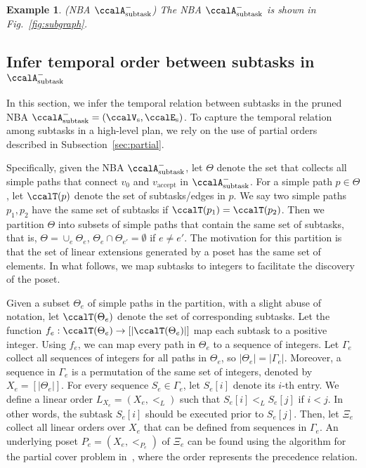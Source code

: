 \documentclass[journal]{IEEEtran}
\newtheorem{exmp}{Example}
\newcommand{\auto}[1]{\ccalA_{\text{#1}}}
\newenvironment{cexmp}
{\addtocounter{exmp}{-1}\begin{exmp}}
  {\end{exmp}}
\begin{document}
\begin{cexmp}(NBA $\auto{subtask}^-$)
 The NBA $\auto{subtask}^-$ is shown in Fig.~\ref{fig:subgraph}.
\end{cexmp}

\subsection{Infer temporal order between subtasks in  $\auto{subtask}^-$}\label{sec:poset}
In this section,  we infer the temporal relation between subtasks in the pruned NBA $\auto{subtask}^- = (\ccalV_\text{s}, \ccalE_\text{s})$. To capture the temporal relation among subtasks in a high-level plan,  we rely on the use of partial orders described in Subsection~\ref{sec:partial}.


Specifically, given the NBA $\auto{subtask}^-$, let $\Theta$ denote the set that collects all simple paths that connect $v_0$ and $v_{\text{accept}}$ in $\auto{subtask}^-$. For a simple path $p\in\Theta$, let $\ccalT(p)$ denote the set of subtasks/edges in $p$. We say two simple paths $p_1, p_2$ have the same set of subtasks if $\ccalT(p_1) =\ccalT(p_2)$. Then we partition $\Theta$ into subsets of  simple paths that contain the same set of subtasks, that is, $\Theta = \cup_e \Theta_e$, $\Theta_e \cap \Theta_{e'} = \emptyset$ if $e\not=e'$. The motivation for this partition is that the set of linear extensions generated by a poset has the same set of elements. {In what follows, we map subtasks to integers to facilitate the discovery of the  poset.}

Given a subset $\Theta_e$ of simple paths in the partition, with a slight abuse of notation, let $\ccalT(\Theta_e)$ denote the set of corresponding  subtasks. Let the function $f_e:\ccalT(\Theta_e)\to [|\ccalT(\Theta_e)|]$ map each subtask to a positive integer. Using $f_e$, we can map every path in $\Theta_e$ to a sequence of integers. Let $\Gamma_e$ collect all sequences of integers for all paths in $\Theta_e$, so $|\Theta_e| \!= \! |\Gamma_e|$. Moreover, a sequence in $\Gamma_e$ is a permutation of the same set of integers, denoted by $X_e = [|\Theta_e|]$. For every sequence $S_e \in \Gamma_e$, let $S_e[i]$ denote its $i$-th entry. We define a linear order $L_{X_e} = (X_e, <_L)$ such that  $S_e[i] \! <_L \! S_e[j] $ if $i \! < \! j$. In other words, the subtask $S_e[i]$ should be executed prior to  $S_e[j]$. Then, let $\Xi_e$ collect all linear orders over $X_e$ that can be defined from sequences in $\Gamma_e$. An underlying poset $P_e \! = \!(X_e, <_{P_e})$ of $\Xi_e$ can be found using the algorithm for the partial cover problem in~\cite{heath2013poset}, where the order represents the precedence relation.
\end{document}
